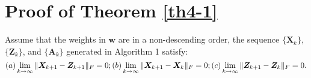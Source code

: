 \section{Proof of Theorem \ref{th4-1}}
\begin{theorem}
Assume that the weights in $\bm{w}$ are in a non-descending order, the sequence $\{\bm{X}_{k}\}$, $\{\bm{Z}_{k}\}$, and $\{\bm{A}_{k}\}$ generated in Algorithm 1 satisfy:
\begin{equation}
\label{equ8-17}
(a) \lim_{k \to \infty} \|\bm{X}_{k+1}-\bm{Z}_{k+1}\|_{F}=0;
\\
(b) \lim_{k \to \infty} \|\bm{X}_{k+1}-\bm{X}_{k}\|_{F}=0;
\\
(c) \lim_{k \to \infty} \|\bm{Z}_{k+1}-\bm{Z}_{k}\|_{F}=0.
\end{equation}
\end{theorem}
